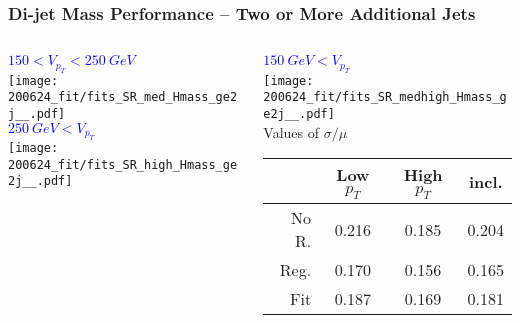 \documentclass{beamer}
\newcommand{\backupend}{
  \addtocounter{framenumbervorappendix}{-\value{framenumber}}
  \addtocounter{framenumber}{\value{framenumbervorappendix}}
}
\begin{document}
\begin{frame}
  \frametitle{Di-jet Mass Performance -- Two or More Additional Jets}

  \begin{columns}
    \begin{column}{0.5\linewidth}
      \centering
      \textcolor{blue}{$150 < V_{p_T} < \SI{250}{GeV}$} \\
      \texttt{[image: 200624\_fit/fits\_SR\_med\_Hmass\_ge2j\_\_.pdf]} \\
      \textcolor{blue}{$\SI{250}{GeV} < V_{p_T}$} \\
      \texttt{[image: 200624\_fit/fits\_SR\_high\_Hmass\_ge2j\_\_.pdf]}
    \end{column}
    \begin{column}{0.5\linewidth}
      \centering
      \textcolor{blue}{$\SI{150}{GeV} < V_{p_T}$} \\
      \texttt{[image: 200624\_fit/fits\_SR\_medhigh\_Hmass\_ge2j\_\_.pdf]} \\

      Values of $\sigma/\mu$
      {\scriptsize
      \begin{tabular}{|r|c|c|c|}
        \hline
        & Low $p_T$ & High $p_T$ & incl. \\
        \hline
        No R. & 0.216 & 0.185 & 0.204 \\
        Reg.  & 0.170 & 0.156 & 0.165 \\
        Fit   & 0.187 & 0.169 & 0.181 \\
        \hline
      \end{tabular}
      }
    \end{column}
  \end{columns}

\end{frame}



\backupend
\end{document}
